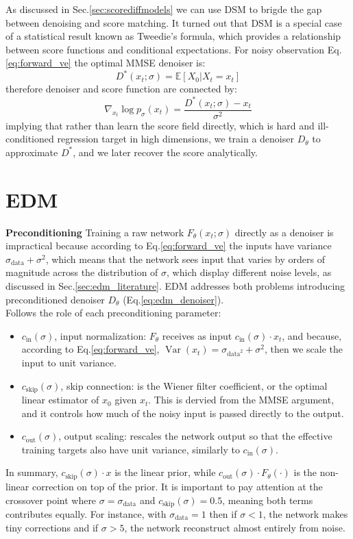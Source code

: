 As discussed in Sec.\ref{sec:scorediffmodels} we can use DSM to brigde the gap between denoising and score matching. It turned out that DSM is a special case of a statistical result known as Tweedie’s formula, which provides a relationship between score functions and conditional expectations. For noisy observation Eq.\ref{eq:forward_ve} the optimal MMSE denoiser is:
\[
D^*(x_t;\sigma)=\mathbb{E}\left[X_0|X_t=x_t\right]
\]
therefore denoiser and score function are connected by:
\[
\nabla_{x_t}\log p_\sigma(x_t)=\frac{D^*(x_t;\sigma)-x_t}{\sigma^2}
\]
implying that rather than learn the score field directly, which is hard and ill-conditioned regression target in high dimensions, we train a denoiser \(D_\theta\) to approximate \(D^*\), and we later recover the score analytically.

\section{EDM}
\textbf{Preconditioning} Training a raw network \(F_\theta (x_t;\sigma)\) directly as a denoiser is impractical because according to 
Eq.\ref{eq:forward_ve} the inputs have variance \(\sigma_{\text{data}}+\sigma^2\), which means that the network sees input that varies by orders of magnitude across the distribution of \(\sigma\), which display different noise levels, as discussed in Sec.\ref{sec:edm_literature}. EDM addresses both problems introducing preconditioned denoiser \(D_\theta\) (Eq.\ref{eq:edm_denoiser}).\\

Follows the role of each preconditioning parameter:
\begin{itemize}
    \item \(c_{\text{in}}(\sigma)\), input normalization: \(F_\theta\) receives as input \(c_{\text{in}}(\sigma)\cdot x_t\), and because, according to Eq.\ref{eq:forward_ve}, \(\operatorname{Var}(x_t)=\sigma_{\text{data}^2}+\sigma^2\), then we scale the input to unit variance.
    \item \(c_{\text{skip}}(\sigma)\), skip connection: is the Wiener filter coefficient, or the optimal linear estimator of \(x_0\) given \(x_t\). This is dervied from the MMSE argument, and it controls how much of the noisy input is passed directly to the output.
    \item \(c_{\text{out}}(\sigma)\), output scaling: rescales the network output so that the effective training targets also have unit variance, similarly to \(c_{\text{in}}(\sigma)\).
\end{itemize}
In summary, \(c_{\text{skip}}(\sigma)\cdot x\) is the linear prior, while \(c_{\text{out}}(\sigma)\cdot F_\theta(\cdot)\) is the non-linear correction on top of the prior. It is important to pay attention at the crossover point where \(\sigma=\sigma_{\text{data}}\) and \(c_{\text{skip}}(\sigma)=0.5\), meaning both terms contributes equally. For instance, with \(\sigma_{\text{data}}=1\) then if \(\sigma<1\), the network makes tiny corrections and if \(\sigma>5\), the network reconstruct almost entirely from noise.\\

